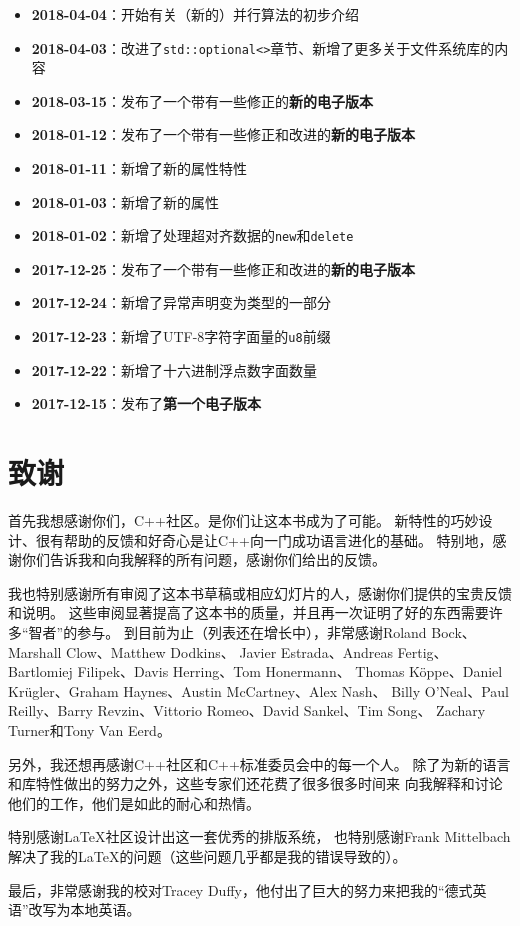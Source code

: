 \begin{itemize}
    \item \textbf{2018-04-04}：开始有关（新的）并行算法的初步介绍
    \item \textbf{2018-04-03}：改进了\texttt{std::optional<>}章节、新增了更多关于文件系统库的内容
    \item \textbf{2018-03-15}：发布了一个带有一些修正的\textbf{新的电子版本}
    \item \textbf{2018-01-12}：发布了一个带有一些修正和改进的\textbf{新的电子版本}
    \item \textbf{2018-01-11}：新增了新的属性特性
    \item \textbf{2018-01-03}：新增了新的属性
    \item \textbf{2018-01-02}：新增了处理超对齐数据的\texttt{new}和\texttt{delete}
    \item \textbf{2017-12-25}：发布了一个带有一些修正和改进的\textbf{新的电子版本}
    \item \textbf{2017-12-24}：新增了异常声明变为类型的一部分
    \item \textbf{2017-12-23}：新增了UTF-8字符字面量的\texttt{u8}前缀
    \item \textbf{2017-12-22}：新增了十六进制浮点数字面数量
    \item \textbf{2017-12-15}：发布了\textbf{第一个电子版本}
\end{itemize}


\section{致谢}
首先我想感谢你们，C++社区。是你们让这本书成为了可能。
新特性的巧妙设计、很有帮助的反馈和好奇心是让C++向一门成功语言进化的基础。
特别地，感谢你们告诉我和向我解释的所有问题，感谢你们给出的反馈。

我也特别感谢所有审阅了这本书草稿或相应幻灯片的人，感谢你们提供的宝贵反馈和说明。
这些审阅显著提高了这本书的质量，并且再一次证明了好的东西需要许多“智者”的参与。
到目前为止（列表还在增长中），非常感谢Roland Bock、Marshall Clow、Matthew Dodkins、
Javier Estrada、Andreas Fertig、Bartlomiej Filipek、Davis Herring、Tom Honermann、
Thomas Köppe、Daniel Krügler、Graham Haynes、Austin McCartney、Alex Nash、
Billy O’Neal、Paul Reilly、Barry Revzin、Vittorio Romeo、David Sankel、Tim Song、
Zachary Turner和Tony Van Eerd。

另外，我还想再感谢C++社区和C++标准委员会中的每一个人。
除了为新的语言和库特性做出的努力之外，这些专家们还花费了很多很多时间来
向我解释和讨论他们的工作，他们是如此的耐心和热情。

特别感谢\LaTeX 社区设计出这一套优秀的排版系统，
也特别感谢Frank Mittelbach解决了我的\LaTeX 的问题（这些问题几乎都是我的错误导致的）。

最后，非常感谢我的校对Tracey Duffy，他付出了巨大的努力来把我的“德式英语”改写为本地英语。